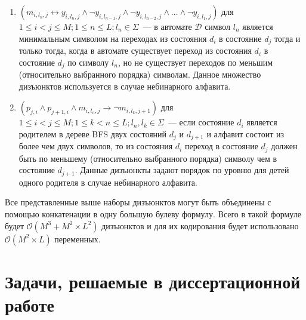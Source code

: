 \begin{enumerate}
  \item $\left(m_{i,l_{n},j} \leftrightarrow y_{i,l_{n},j} \wedge \neg y_{i,l_{n - 1}, j} \wedge \neg y_{i,l_{n - 2}, j} \wedge \ldots \wedge \neg y_{i,l_{1},j} \right)$ для $1 \leq i < j \leq M; 1 \leq n \leq L;l_{n} \in \Sigma$~{---} в автомате $\mathcal{D}$ символ $l_{n}$ является минимальным символом на переходах из состояния $d_{i}$ в состояние $d_{j}$ тогда и только тогда, когда в автомате существует переход из состояния $d_{i}$ в состояние $d_{j}$ по символу $l_{n}$, но не существует переходов по меньшим (относительно выбранного порядка) символам.
  Данное множество дизъюнктов используется в случае небинарного алфавита.

  \item $\left(p_{j,i} \wedge p_{j + 1, i} \wedge m_{i,l_{n}, j} \rightarrow \neg m_{i, l_{k}, j + 1}\right)$ для $1 \leq i < j \leq M; 1 \leq k < n \leq L;l_n,l_k \in \Sigma$~{---} если состояние $d_{i}$ является родителем в дереве BFS двух состояний $d_{j}$ и $d_{j + 1}$ и алфавит состоит из более чем двух символов, то из состояния $d_{i}$ переход в состояние $d_{j}$ должен быть по меньшему (относительно выбранного порядка) символу чем в состояние $d_{j + 1}$.
  Данные дизъюнкты задают порядок по уровню для детей одного родителя в случае небинарного алфавита.
\end{enumerate}

Все представленные выше наборы дизъюнктов могут быть объединены с помощью конкатенации в одну большую булеву формулу. Всего в такой формуле будет $\mathcal{O}(M^{3} + M^{2} \times L^{2})$ дизъюнктов и для их кодирования будет использовано $\mathcal{O}(M^2 \times L)$ переменных.


\section{Задачи, решаемые в диссертационной работе}
\label{sec:review:tasks}



\chresults{\ref{sec:review}}